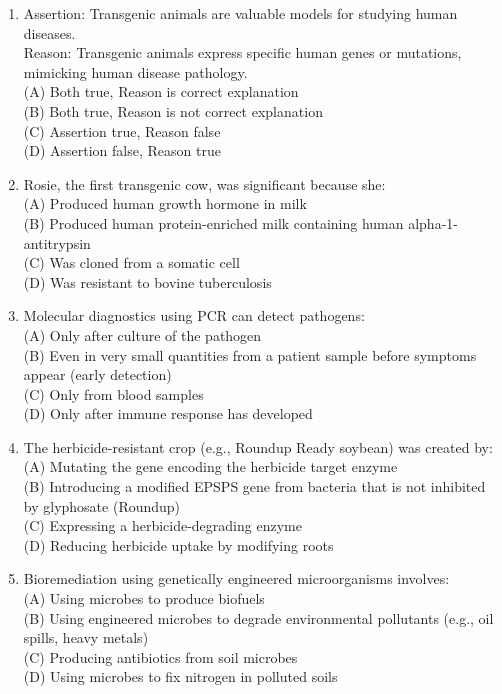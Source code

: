 \documentclass{article}
\begin{document}
\begin{enumerate}[label=Q\arabic*.]
\item Assertion: Transgenic animals are valuable models for studying human diseases.\\
Reason: Transgenic animals express specific human genes or mutations, mimicking human disease pathology.
\\(A) Both true, Reason is correct explanation
\\(B) Both true, Reason is not correct explanation
\\(C) Assertion true, Reason false
\\(D) Assertion false, Reason true

\item Rosie, the first transgenic cow, was significant because she:
\\(A) Produced human growth hormone in milk
\\(B) Produced human protein-enriched milk containing human alpha-1-antitrypsin
\\(C) Was cloned from a somatic cell
\\(D) Was resistant to bovine tuberculosis

\item Molecular diagnostics using PCR can detect pathogens:
\\(A) Only after culture of the pathogen
\\(B) Even in very small quantities from a patient sample before symptoms appear (early detection)
\\(C) Only from blood samples
\\(D) Only after immune response has developed

\item The herbicide-resistant crop (e.g., Roundup Ready soybean) was created by:
\\(A) Mutating the gene encoding the herbicide target enzyme
\\(B) Introducing a modified EPSPS gene from bacteria that is not inhibited by glyphosate (Roundup)
\\(C) Expressing a herbicide-degrading enzyme
\\(D) Reducing herbicide uptake by modifying roots

\item Bioremediation using genetically engineered microorganisms involves:
\\(A) Using microbes to produce biofuels
\\(B) Using engineered microbes to degrade environmental pollutants (e.g., oil spills, heavy metals)
\\(C) Producing antibiotics from soil microbes
\\(D) Using microbes to fix nitrogen in polluted soils


\end{enumerate}
\end{document}
